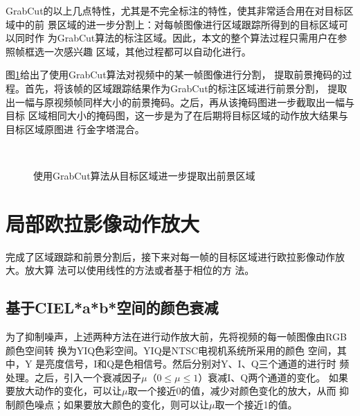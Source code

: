 GrabCut的以上几点特性，尤其是不完全标注的特性，使其非常适合用在对目标区域中的前
景区域的进一步分割上：对每帧图像进行区域跟踪所得到的目标区域可以同时作
为GrabCut算法的标注区域。因此，本文的整个算法过程只需用户在参照帧框选一次感兴趣
区域，其他过程都可以自动化进行。

图\ref{fig:grabcut-result}给出了使用GrabCut算法对视频中的某一帧图像进行分割，
提取前景掩码的过程。首先，将该帧的区域跟踪结果作为GrabCut的标注区域进行前景分割，
提取出一幅与原视频帧同样大小的前景掩码。之后，再从该掩码图进一步截取出一幅与目标
区域相同大小的掩码图，这一步是为了在后期将目标区域的动作放大结果与目标区域原图进
行金字塔混合。

\begin{figure}[htbp]
  \centering
  \qquad
  \qquad\\
  \qquad
  \qquad
  \caption{使用GrabCut算法从目标区域进一步提取出前景区域}
  \label{fig:grabcut-result}
\end{figure}

\section{局部欧拉影像动作放大}
\label{sec:local-evm}

完成了区域跟踪和前景分割后，接下来对每一帧的目标区域进行欧拉影像动作放大。放大算
法可以使用线性的方法或者基于相位的方
法。

\subsection{基于CIEL*a*b*空间的颜色衰减}
\label{sec:cielab}

为了抑制噪声，上述两种方法在进行动作放大前，先将视频的每一帧图像由RGB颜色空间转
换为YIQ色彩空间。YIQ是NTSC电视机系统所采用的颜色
空间，其中，Y 是亮度信号，I和Q是色相信号。然后分别对Y、I、Q三个通道的进行时
频处理。之后，引入一个衰减因子$\mu$（$0\le \mu \le 1$）衰减I、Q两个通道的变化。
如果要放大动作的变化，可以让$\mu$取一个接近0的值，减少对颜色变化的放大，从而
抑制颜色噪点；如果要放大颜色的变化，则可以让$\mu$取一个接近1的值。

